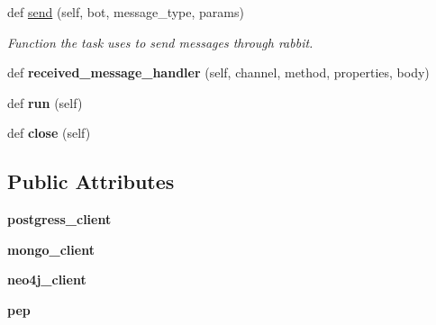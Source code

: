 \begin{DoxyCompactItemize}
def \hyperlink{classtwitter_1_1control__center_1_1dbwriter_1_1DBWriter_a3a6e2d36449a7f745d31e328cc4d92d9}{send} (self, bot, message\+\_\+type, params)
\begin{DoxyCompactList}\small\item\em Function the task uses to send messages through rabbit. \end{DoxyCompactList}\item 
\mbox{\label{classtwitter_1_1control__center_1_1dbwriter_1_1DBWriter_aa12d98995c446702bb434fff2e6ee0fd}} 
def {\bfseries received\+\_\+message\+\_\+handler} (self, channel, method, properties, body)
\item 
\mbox{\label{classtwitter_1_1control__center_1_1dbwriter_1_1DBWriter_a6236ff72370378d82719e4a74e120923}} 
def {\bfseries run} (self)
\item 
\mbox{\label{classtwitter_1_1control__center_1_1dbwriter_1_1DBWriter_aa06680faca4d475457fe1d19d95959ca}} 
def {\bfseries close} (self)
\end{DoxyCompactItemize}
\subsection*{Public Attributes}
\begin{DoxyCompactItemize}
\item 
\mbox{\label{classtwitter_1_1control__center_1_1dbwriter_1_1DBWriter_a6473c85a2b62791269ee42ce1731513c}} 
{\bfseries postgress\+\_\+client}
\item 
\mbox{\label{classtwitter_1_1control__center_1_1dbwriter_1_1DBWriter_acd3d98d13d85fb9335b8d4e9c866a2ab}} 
{\bfseries mongo\+\_\+client}
\item 
\mbox{\label{classtwitter_1_1control__center_1_1dbwriter_1_1DBWriter_a5375348c728a40d18617e644d4aa1c39}} 
{\bfseries neo4j\+\_\+client}
\item 
\mbox{\label{classtwitter_1_1control__center_1_1dbwriter_1_1DBWriter_a531422c00b00ab64a2ad93133bc0e4d2}} 
{\bfseries pep}
\end{DoxyCompactItemize}


